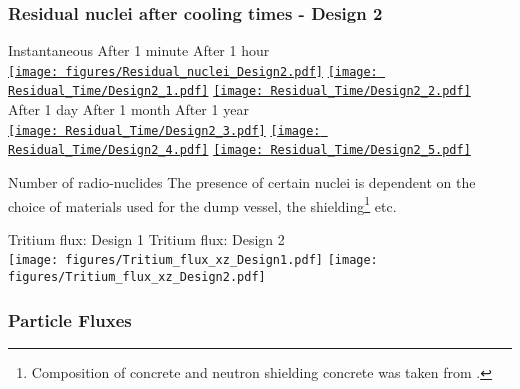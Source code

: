 \documentclass[xcolor={dvipsnames}]{beamer}
\begin{document}
\begin{frame}
  \frametitle{Residual nuclei after cooling times - Design 2}
  \hypertarget{residualtimesprev_Design2}{}
  \begin{center}
    \hspace*{1cm} Instantaneous \hfill After 1 minute \hfill After 1 hour \hspace*{1.2cm} \\
  \hyperlink{Residual_nuclei_Design2}{\texttt{[image: figures/Residual\_nuclei\_Design2.pdf]}}
  \hyperlink{Residual_nuclei_minute_Design2}{\texttt{[image: Residual\_Time/Design2\_1.pdf]}}
  \hyperlink{Residual_nuclei_hour_Design2}{\texttt{[image: Residual\_Time/Design2\_2.pdf]}}\\
    \hspace*{1cm} After 1 day \hfill After 1 month \hfill After 1 year\hspace*{1.4cm} \\
  \hyperlink{Residual_nuclei_day_Design2}{\texttt{[image: Residual\_Time/Design2\_3.pdf]}}
  \hyperlink{Residual_nuclei_month_Design2}{\texttt{[image: Residual\_Time/Design2\_4.pdf]}}
  \hyperlink{Residual_nuclei_year_Design2}{\texttt{[image: Residual\_Time/Design2\_5.pdf]}}
 \end{center}
\end{frame}

\begin{frame}{Number of radio-nuclides}
The presence of certain nuclei is dependent on the choice of materials used for the dump vessel, the shielding\footnote{Composition of concrete and neutron shielding concrete was taken from \cite{Concrete}.} etc.
\begin{center}
\hspace*{1cm} Tritium flux: Design 1 \hfill Tritium flux: Design 2 \hspace*{1cm} \\
  \texttt{[image: figures/Tritium\_flux\_xz\_Design1.pdf]}
    \texttt{[image: figures/Tritium\_flux\_xz\_Design2.pdf]}
 \end{center}
\end{frame}

\subsubsection{Particle Fluxes}
\end{document}
